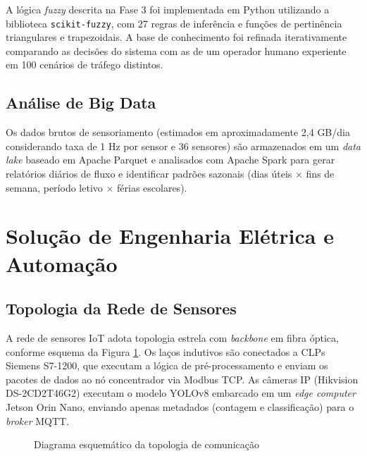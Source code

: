 \documentclass[12pt,a4paper,oneside]{abntex2}
\begin{document}
A lógica \textit{fuzzy} descrita na Fase 3 foi implementada em Python utilizando a biblioteca \texttt{scikit-fuzzy}, com 27 regras de inferência e funções de pertinência triangulares e trapezoidais. A base de conhecimento foi refinada iterativamente comparando as decisões do sistema com as de um operador humano experiente em 100 cenários de tráfego distintos.

\subsection{Análise de Big Data}

Os dados brutos de sensoriamento (estimados em aproximadamente 2,4 GB/dia considerando taxa de 1 Hz por sensor e 36 sensores) são armazenados em um \textit{data lake} baseado em Apache Parquet e analisados com Apache Spark para gerar relatórios diários de fluxo e identificar padrões sazonais (dias úteis $\times$ fins de semana, período letivo $\times$ férias escolares).

\section{Solução de Engenharia Elétrica e Automação}

\subsection{Topologia da Rede de Sensores}

A rede de sensores IoT adota topologia estrela com \textit{backbone} em fibra óptica, conforme esquema da Figura \ref{fig:topologia}. Os laços indutivos são conectados a CLPs Siemens S7-1200, que executam a lógica de pré-processamento e enviam os pacotes de dados ao nó concentrador via Modbus TCP. As câmeras IP (Hikvision DS-2CD2T46G2) executam o modelo YOLOv8 embarcado em um \textit{edge computer} Jetson Orin Nano, enviando apenas metadados (contagem e classificação) para o \textit{broker} MQTT.

\begin{figure}[H]
\centering
{}
\caption{Diagrama esquemático da topologia de comunicação}
\label{fig:topologia}
\end{figure}
\end{document}
